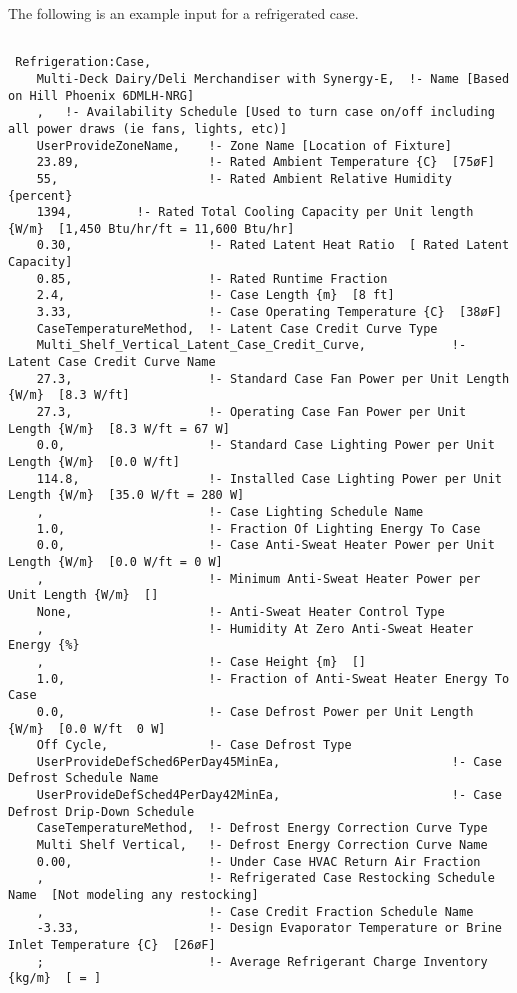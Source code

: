 The following is an example input for a refrigerated case.

\begin{lstlisting}

 Refrigeration:Case,
    Multi-Deck Dairy/Deli Merchandiser with Synergy-E,  !- Name [Based on Hill Phoenix 6DMLH-NRG]
    ,   !- Availability Schedule [Used to turn case on/off including all power draws (ie fans, lights, etc)]
    UserProvideZoneName,    !- Zone Name [Location of Fixture]
    23.89,                  !- Rated Ambient Temperature {C}  [75øF]
    55,                     !- Rated Ambient Relative Humidity {percent}
    1394,         !- Rated Total Cooling Capacity per Unit length {W/m}  [1,450 Btu/hr/ft = 11,600 Btu/hr]
    0.30,                   !- Rated Latent Heat Ratio  [ Rated Latent Capacity]
    0.85,                   !- Rated Runtime Fraction
    2.4,                    !- Case Length {m}  [8 ft]
    3.33,                   !- Case Operating Temperature {C}  [38øF]
    CaseTemperatureMethod,  !- Latent Case Credit Curve Type
    Multi_Shelf_Vertical_Latent_Case_Credit_Curve,            !- Latent Case Credit Curve Name
    27.3,                   !- Standard Case Fan Power per Unit Length {W/m}  [8.3 W/ft]
    27.3,                   !- Operating Case Fan Power per Unit Length {W/m}  [8.3 W/ft = 67 W]
    0.0,                    !- Standard Case Lighting Power per Unit Length {W/m}  [0.0 W/ft]
    114.8,                  !- Installed Case Lighting Power per Unit Length {W/m}  [35.0 W/ft = 280 W]
    ,                       !- Case Lighting Schedule Name
    1.0,                    !- Fraction Of Lighting Energy To Case
    0.0,                    !- Case Anti-Sweat Heater Power per Unit Length {W/m}  [0.0 W/ft = 0 W]
    ,                       !- Minimum Anti-Sweat Heater Power per Unit Length {W/m}  []
    None,                   !- Anti-Sweat Heater Control Type
    ,                       !- Humidity At Zero Anti-Sweat Heater Energy {%}
    ,                       !- Case Height {m}  []
    1.0,                    !- Fraction of Anti-Sweat Heater Energy To Case
    0.0,                    !- Case Defrost Power per Unit Length {W/m}  [0.0 W/ft  0 W]
    Off Cycle,              !- Case Defrost Type
    UserProvideDefSched6PerDay45MinEa,                        !- Case Defrost Schedule Name
    UserProvideDefSched4PerDay42MinEa,                        !- Case Defrost Drip-Down Schedule
    CaseTemperatureMethod,  !- Defrost Energy Correction Curve Type
    Multi Shelf Vertical,   !- Defrost Energy Correction Curve Name
    0.00,                   !- Under Case HVAC Return Air Fraction
    ,                       !- Refrigerated Case Restocking Schedule Name  [Not modeling any restocking]
    ,                       !- Case Credit Fraction Schedule Name
    -3.33,                  !- Design Evaporator Temperature or Brine Inlet Temperature {C}  [26øF]
    ;                       !- Average Refrigerant Charge Inventory {kg/m}  [ = ]
\end{lstlisting}

